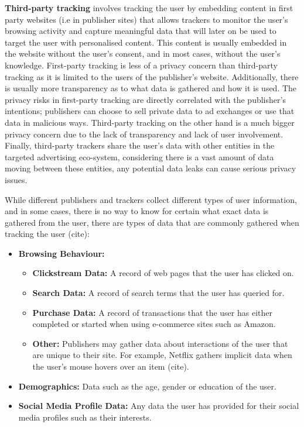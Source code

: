\documentclass{l4proj}
\begin{document}
\textbf{Third-party tracking} involves tracking the user by embedding content in first party websites (i.e in publisher sites) that allows trackers to monitor the user's browsing activity and capture meaningful data that will later on be used to target the user with personalised content. This content is usually embedded in the website without the user's consent, and in most cases, without the user's knowledge.
First-party tracking is less of a privacy concern than third-party tracking as it is limited to the users of the publisher's website. Additionally, there is usually more transparency as to what data is gathered and how it is used. The privacy risks in first-party tracking are directly correlated with the publisher's intentions; publishers can choose to sell private data to ad exchanges or use that data in malicious ways. Third-party tracking on the other hand is a much bigger privacy concern due to the lack of transparency and lack of user involvement. Finally, third-party trackers share the user's data with other entities in the targeted advertising eco-system, considering there is a vast amount of data moving between these entities, any potential data leaks can cause serious privacy issues. 

While different publishers and trackers collect different types of user information, and in some cases, there is no way to know for certain what exact data is gathered from the user, there are types of data that are commonly gathered when tracking the user (cite):
\begin{itemize}
   \item 
   \textbf{Browsing Behaviour:}
   \begin{itemize}
	\item
           \textbf{Clickstream Data:} A record of web pages that the user has clicked on.
	\item
           \textbf{Search Data:} A record of search terms that the user has queried for.
	\item
           \textbf{Purchase Data:} A record of transactions that the user has either completed or started when using e-commerce sites such as Amazon.
	\item
           \textbf{Other:} Publishers may gather data about interactions of the user that are unique to their site. For example, Netflix gathers implicit data when the user's mouse hovers over an item (cite).
   \end{itemize}
   \item
   \textbf{Demographics:} Data such as the age, gender or education of the user.
   \item
   \textbf{Social Media Profile Data:} Any data the user has provided for their social media profiles such as their interests. 
\end{itemize}
\end{document}
